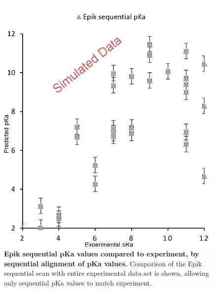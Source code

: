 \documentclass[9pt,lineno,final]{elife}
\begin{document}
\begin{figure}[H]
	\centering
	\includegraphics[width=0.8\linewidth]{sequential-pKa-comparison-simulated.png}	
	\caption{{\bf Epik sequential pKa values compared to experiment, by sequential alignment of pKa values.}
		Comparison of the Epik sequential scan with entire experimental data set is shown, allowing only sequential pKa values to match experiment.\label{fig:correlation-sequential}}
\end{figure}
    
\end{document}
